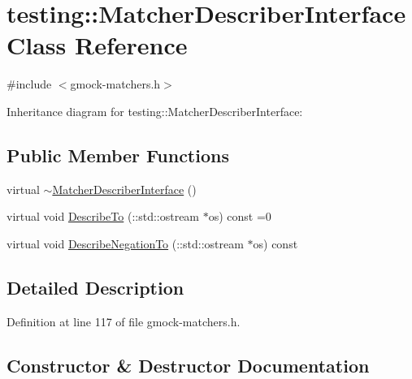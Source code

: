 \hypertarget{classtesting_1_1_matcher_describer_interface}{}\section{testing\+:\+:Matcher\+Describer\+Interface Class Reference}
\label{classtesting_1_1_matcher_describer_interface}


{\ttfamily \#include $<$gmock-\/matchers.\+h$>$}



Inheritance diagram for testing\+:\+:Matcher\+Describer\+Interface\+:
\subsection*{Public Member Functions}
\begin{DoxyCompactItemize}
\item 
virtual \hyperlink{classtesting_1_1_matcher_describer_interface_ae2236a56ad2cc35cad10efc1208854f4}{$\sim$\+Matcher\+Describer\+Interface} ()
\item 
virtual void \hyperlink{classtesting_1_1_matcher_describer_interface_ad9f861588bd969b6e3e717f13bb94e7b}{Describe\+To} (\+::std\+::ostream $\ast$os) const =0
\item 
virtual void \hyperlink{classtesting_1_1_matcher_describer_interface_a35b9dc2f3e25ca4b903f282feaaf9f8c}{Describe\+Negation\+To} (\+::std\+::ostream $\ast$os) const 
\end{DoxyCompactItemize}


\subsection{Detailed Description}


Definition at line 117 of file gmock-\/matchers.\+h.



\subsection{Constructor \& Destructor Documentation}
